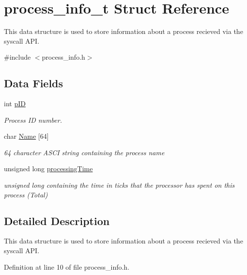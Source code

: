 \hypertarget{structprocess__info__t}{
\section{process\_\-info\_\-t Struct Reference}
\label{structprocess__info__t}
}


This data structure is used to store information about a process recieved via the syscall API.  




{\ttfamily \#include $<$process\_\-info.h$>$}

\subsection*{Data Fields}
\begin{DoxyCompactItemize}
\item 
int \hyperlink{structprocess__info__t_a3662d03c6f9db2c9b02d9c2eb7b5eb88}{pID}
\begin{DoxyCompactList}\small\item\em Process ID number. \item\end{DoxyCompactList}\item 
char \hyperlink{structprocess__info__t_a4dfd7018290aeac9e4ed3b7309484a45}{Name} \mbox{[}64\mbox{]}
\begin{DoxyCompactList}\small\item\em 64 character ASCI string containing the process name \item\end{DoxyCompactList}\item 
unsigned long \hyperlink{structprocess__info__t_acf06bec557ae461f71c391f0e604ecd8}{processingTime}
\begin{DoxyCompactList}\small\item\em unsigned long containing the time in ticks that the processor has spent on this process (Total) \item\end{DoxyCompactList}\end{DoxyCompactItemize}


\subsection{Detailed Description}
This data structure is used to store information about a process recieved via the syscall API. 

Definition at line 10 of file process\_\-info.h.



